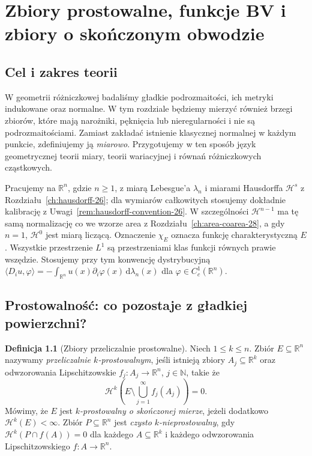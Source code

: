 \documentclass[11pt,a4paper,oneside]{book}
\numberwithin{equation}{chapter}
\theoremstyle{plain}
\theoremstyle{definition}
\newtheorem{definicja}[twierdzenie]{Definicja}
\theoremstyle{remark}
\begin{document}


\chapter[Prostowalność i zbiory o skończonym obwodzie]{Zbiory prostowalne, funkcje BV i zbiory o skończonym obwodzie}
\label{ch:geometric-measure-29}

\section{Cel i zakres teorii}
W geometrii różniczkowej badaliśmy gładkie podrozmaitości, ich
metryki indukowane oraz normalne. W tym rozdziale będziemy mierzyć
również brzegi zbiorów, które mają narożniki, pęknięcia lub
nieregularności i nie są podrozmaitościami. Zamiast zakładać
istnienie klasycznej normalnej w każdym punkcie, zdefiniujemy ją
\emph{miarowo}. Przygotujemy w ten sposób język geometrycznej
teorii miary, teorii wariacyjnej i równań różniczkowych cząstkowych.

Pracujemy na $\mathbb R^n$, gdzie $n\ge1$, z miarą Lebesgue'a
$\lambda_n$ i miarami Hausdorffa $\mathcal H^s$
z Rozdziału~\ref{ch:hausdorff-26}; dla wymiarów
całkowitych stosujemy dokładnie kalibrację
z Uwagi~\ref{rem:hausdorff-convention-26}.
W szczególności $\mathcal H^{n-1}$ ma tę samą
normalizację co we wzorze area z
Rozdziału~\ref{ch:area-coarea-28}, a gdy $n=1$,
$\mathcal H^0$ jest miarą liczącą. Oznaczenie $\chi_E$ oznacza
funkcję charakterystyczną $E$. Wszystkie przestrzenie $L^1$
są przestrzeniami klas funkcji równych prawie wszędzie.
Stosujemy przy tym konwencję dystrybucyjną
$\langle D_i u,\varphi\rangle=-\int_{\mathbb R^n}u(x)
\partial_i\varphi(x)\,\mathrm d\lambda_n(x)$ dla
$\varphi\in C_c^1(\mathbb R^n)$.

\section{Prostowalność: co pozostaje z gładkiej powierzchni?}
\begin{definicja}[Zbiory przeliczalnie prostowalne]
\label{def:rectifiable-29}
Niech $1\le k\le n$. Zbiór $E\subseteq\mathbb R^n$ nazywamy
\emph{przeliczalnie $k$-prostowalnym}, jeśli istnieją
zbiory $A_j\subseteq\mathbb R^k$ oraz odwzorowania
Lipschitzowskie $f_j:A_j\to\mathbb R^n$, $j\in\mathbb N$,
takie że
\[
 \mathcal H^k\!\left(E\setminus\bigcup_{j=1}^\infty f_j(A_j)\right)=0.
\]
Mówimy, że $E$ jest \emph{$k$-prostowalny o skończonej mierze},
jeżeli dodatkowo $\mathcal H^k(E)<\infty$.
Zbiór $P\subseteq\mathbb R^n$ jest \emph{czysto
$k$-nieprostowalny}, gdy
$\mathcal H^k(P\cap f(A))=0$ dla każdego
$A\subseteq\mathbb R^k$ i każdego odwzorowania
Lipschitzowskiego $f:A\to\mathbb R^n$.
\end{definicja}
\end{document}
